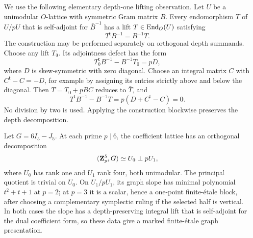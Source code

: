 We use the following elementary depth-one lifting observation.  Let \(U\) be
a unimodular \(O\)-lattice with symmetric Gram matrix \(B\).  Every
endomorphism \(\bar T\) of \(U/pU\) that is self-adjoint for
\(\bar B^{-1}\) has a lift \(T\in\operatorname{End}_O(U)\) satisfying
\begin{equation}
 T^{\mathsf t}B^{-1}=B^{-1}T.
 \label{eq:depth-one-self-adjoint-lift}
\end{equation}
The construction may be performed separately on orthogonal depth summands.
Choose any lift \(T_0\).  Its adjointness defect has the form
\[
 T_0^{\mathsf t}B^{-1}-B^{-1}T_0=pD,
\]
where \(D\) is skew-symmetric with zero diagonal.  Choose an integral matrix
\(C\) with \(C^{\mathsf t}-C=-D\), for example by assigning its entries
strictly above and below the diagonal.  Then \(T=T_0+pBC\) reduces to
\(\bar T\), and
\[
 T^{\mathsf t}B^{-1}-B^{-1}T
 =p(D+C^{\mathsf t}-C)=0.
\]
No division by two is used.  Applying the construction blockwise preserves
the depth decomposition.

\begin{lemma}
\label{lem:six-axis-local-chart}
%
%
Let \(G=6I_5-J_5\).  At each prime \(p\mid6\), the coefficient lattice has
an orthogonal decomposition
\[
 (\mathbf Z_p^5,G)\simeq U_0\perp pU_1,
\]
where \(U_0\) has rank one and \(U_1\) rank four, both unimodular.  The
principal quotient is trivial on \(U_0\).  On \(U_1/pU_1\), its graph slope
has minimal polynomial \(t^2+t+1\) at \(p=2\); at \(p=3\) it is a scalar,
hence a one-point finite-\'etale block, after choosing a complementary
symplectic ruling if the selected half is vertical.  In both cases the slope has a
depth-preserving integral lift that is self-adjoint for the dual coefficient
form, so these data give a marked finite-\'etale graph presentation.
\end{lemma}

